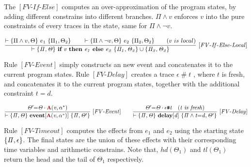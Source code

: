 \documentclass[acmsmall,10pt,review]{acmart}
\newcommand{\anyevent}[1]{{\textcolor{darkred}
{{\textbf{\small #1}}}}}
\newcommand{\code}[1]{{\tt{\ensuremath{\m{#1}}}}}
\newcommand{\m}{\mathit}
\newcommand{\mysharp}{{\mathrel{\texttt{\#}}}}
\begin{document}
{The \code{[FV\text{-}If\text{-}Else]} computes an 
over-approximation of the program states, by adding different constrains into 
different branches. \code{\Pi \wedge v} enforces 
\code{v} into the pure constraints of every traces in the state, same 
for \code{\Pi \wedge \neg v }.

{{\small\begin{gather*}
  \code{\frac{ 
    \begin{matrix}
\vdash \{ \Pi \wedge v, \Theta    \} \ e_1 \ \{  \Pi_1, \Theta_2 \} 
\qquad 
\vdash \{ \Pi \wedge \neg v , \Theta  \} \ e_2 \ 
\{  \Pi_2, \Theta_2 \}  
\qquad (v\ is\ local)
\end{matrix}}
  {\vdash \s{ \Pi, \Theta}\  \textbf{if}\ v\ \textbf{then}\ e_1\ 
  \textbf{else}\ e_2 \ \s{ \Pi_1, \Theta_2} \cup \s{\Pi_2, \Theta_2} } \  
  {[FV\text{-}If\text{-}Else\text{-}Local]}} 
  \end{gather*}}}



Rule \code{[FV\text{-}Event]} simply constructs an new event and 
concatenates it to the current program states. 
Rule \code{[FV\text{-}Delay]} creates a trace \code{\epsilon\mysharp t}
, where \code{t} is fresh, and concatenates it to the current program states, 
together with the additional constraint \code{t{=}d}. 

  {{\small\begin{gather*}
  \code{\frac{
    \Theta^\prime {=} \Theta\cdot \anyevent{A}(v, \alpha^*) 
    }
  {\vdash \s{ \Pi, \Theta} \  
  \textbf{event} [\anyevent{A}(v, \alpha^*)] 
   \ \{\Pi, \Theta^\prime \}} \   {[FV\text{-}Event]}} 
   \qquad
  \code{\frac{
    \Theta^\prime {=} \Theta\cdot \epsilon\mysharp t \quad (t\ is\ fresh) 
    }
  {\vdash \s{ \Pi, \Theta} \  
  \textbf{delay} [d] 
   \ \{ \Pi \wedge  t {=}d,  \Theta^\prime \}} \   {[FV\text{-}Delay]}} 
\end{gather*}}}



Rule \code{[FV\text{-}Timeout]} computes the effects from \code{e_1} and \code{e_2}
using the starting state \code{\s{\Pi, \epsilon}}. The final states are the union 
of these effects with their corresponding time variables and arithmetic constrains. 
Note that, \code{hd(\Theta_1)} and \code{tl(\Theta_1)} return the head and the tail of 
\code{\Theta_1} respectively. 

}
\end{document}
